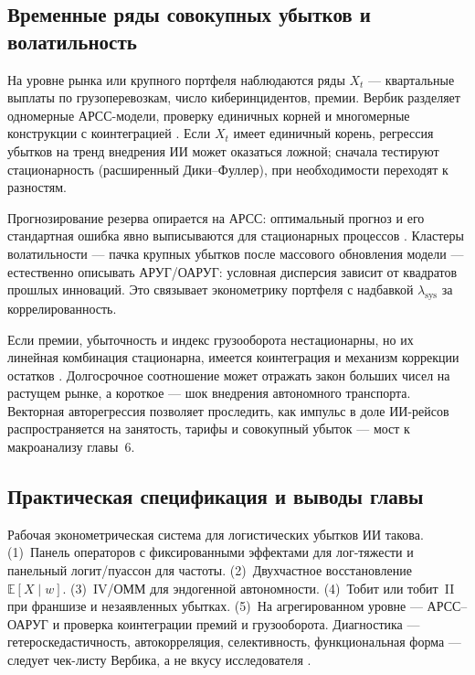 \documentclass[a4paper,14pt]{extarticle}
\begin{document}
\subsection{Временные ряды совокупных убытков и волатильность}

На уровне рынка или крупного портфеля наблюдаются ряды $X_t$ --- квартальные выплаты по грузоперевозкам, число киберинцидентов, премии. Вербик разделяет одномерные АРСС-модели, проверку единичных корней и многомерные конструкции с коинтеграцией \cite{verbeek}. Если $X_t$ имеет единичный корень, регрессия убытков на тренд внедрения ИИ может оказаться ложной; сначала тестируют стационарность (расширенный Дики--Фуллер), при необходимости переходят к разностям.

Прогнозирование резерва опирается на АРСС: оптимальный прогноз и его стандартная ошибка явно выписываются для стационарных процессов \cite{verbeek}. Кластеры волатильности --- пачка крупных убытков после массового обновления модели --- естественно описывать АРУГ/ОАРУГ: условная дисперсия зависит от квадратов прошлых инноваций. Это связывает эконометрику портфеля с надбавкой $\lambda_{\mathrm{sys}}$ за коррелированность.

Если премии, убыточность и индекс грузооборота нестационарны, но их линейная комбинация стационарна, имеется коинтеграция и механизм коррекции остатков \cite{verbeek}. Долгосрочное соотношение может отражать закон больших чисел на растущем рынке, а короткое --- шок внедрения автономного транспорта. Векторная авторегрессия позволяет проследить, как импульс в доле ИИ-рейсов распространяется на занятость, тарифы и совокупный убыток --- мост к макроанализу главы~6.

\subsection{Практическая спецификация и выводы главы}

Рабочая эконометрическая система для логистических убытков ИИ такова. (1)~Панель операторов с фиксированными эффектами для лог-тяжести и панельный логит/пуассон для частоты. (2)~Двухчастное восстановление $\mathbb{E}[X\mid w]$. (3)~IV/ОММ для эндогенной автономности. (4)~Тобит или тобит~II при франшизе и незаявленных убытках. (5)~На агрегированном уровне --- АРСС--ОАРУГ и проверка коинтеграции премий и грузооборота. Диагностика --- гетероскедастичность, автокорреляция, селективность, функциональная форма --- следует чек-листу Вербика, а не вкусу исследователя \cite{verbeek}.
\end{document}
